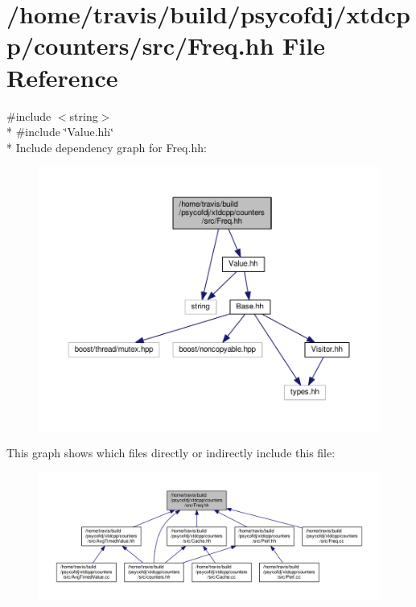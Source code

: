 \hypertarget{Freq_8hh}{\section{/home/travis/build/psycofdj/xtdcpp/counters/src/\-Freq.hh File Reference}
\label{Freq_8hh}
}
{\ttfamily \#include $<$string$>$}\\*
{\ttfamily \#include \char`\"{}Value.\-hh\char`\"{}}\\*
Include dependency graph for Freq.\-hh\-:
\nopagebreak
\begin{figure}[H]
\begin{center}
\leavevmode
\includegraphics[width=350pt]{Freq_8hh__incl}
\end{center}
\end{figure}
This graph shows which files directly or indirectly include this file\-:
\nopagebreak
\begin{figure}[H]
\begin{center}
\leavevmode
\includegraphics[width=350pt]{Freq_8hh__dep__incl}
\end{center}
\end{figure}
